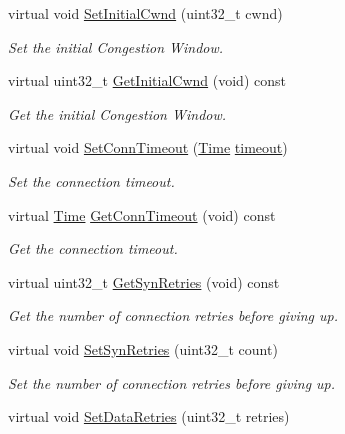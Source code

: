 \begin{DoxyCompactItemize}
virtual void \hyperlink{classns3_1_1NscTcpSocketImpl_a089c4c2bda661914feb557d59c26b06a}{Set\+Initial\+Cwnd} (uint32\+\_\+t cwnd)
\begin{DoxyCompactList}\small\item\em Set the initial Congestion Window. \end{DoxyCompactList}\item 
virtual uint32\+\_\+t \hyperlink{classns3_1_1NscTcpSocketImpl_a9e2b984e832c23c716817170fa430ff0}{Get\+Initial\+Cwnd} (void) const 
\begin{DoxyCompactList}\small\item\em Get the initial Congestion Window. \end{DoxyCompactList}\item 
virtual void \hyperlink{classns3_1_1NscTcpSocketImpl_a868205da713236dccb4dabebaae86ead}{Set\+Conn\+Timeout} (\hyperlink{classns3_1_1Time}{Time} \hyperlink{openflow-switch_8cc_a386d174ae121d1cfa279074b7e209714}{timeout})
\begin{DoxyCompactList}\small\item\em Set the connection timeout. \end{DoxyCompactList}\item 
virtual \hyperlink{classns3_1_1Time}{Time} \hyperlink{classns3_1_1NscTcpSocketImpl_a32e2c9af6e839136e3e4abc876118c6c}{Get\+Conn\+Timeout} (void) const 
\begin{DoxyCompactList}\small\item\em Get the connection timeout. \end{DoxyCompactList}\item 
virtual uint32\+\_\+t \hyperlink{classns3_1_1NscTcpSocketImpl_ae933fb2792652a627f4b004afbbcdad7}{Get\+Syn\+Retries} (void) const 
\begin{DoxyCompactList}\small\item\em Get the number of connection retries before giving up. \end{DoxyCompactList}\item 
virtual void \hyperlink{classns3_1_1NscTcpSocketImpl_abcbd73db7e9a9f5a63e159b02eeb7da0}{Set\+Syn\+Retries} (uint32\+\_\+t count)
\begin{DoxyCompactList}\small\item\em Set the number of connection retries before giving up. \end{DoxyCompactList}\item 
virtual void \hyperlink{classns3_1_1NscTcpSocketImpl_a73d8c6b0c0c89a18ca04d01a9a660566}{Set\+Data\+Retries} (uint32\+\_\+t retries)

\end{DoxyCompactItemize}
